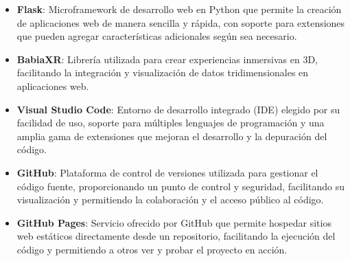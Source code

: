 \documentclass[a4paper, 12pt]{book}
\begin{document}
\begin{itemize}
    \item \textbf{Flask}: Microframework de desarrollo web en Python que permite la creación de aplicaciones web de manera sencilla y rápida, con soporte para extensiones que pueden agregar características adicionales según sea necesario.

    \item \textbf{BabiaXR}: Librería utilizada para crear experiencias inmersivas en 3D, facilitando la integración y visualización de datos tridimensionales en aplicaciones web.

    \item \textbf{Visual Studio Code}: Entorno de desarrollo integrado (IDE) elegido por su facilidad de uso, soporte para múltiples lenguajes de programación y una amplia gama de extensiones que mejoran el desarrollo y la depuración del código.

    \item \textbf{GitHub}: Plataforma de control de versiones utilizada para gestionar el código fuente, proporcionando un punto de control y seguridad, facilitando su visualización y permitiendo la colaboración y el acceso público al código.

    \item \textbf{GitHub Pages}: Servicio ofrecido por GitHub que permite hospedar sitios web estáticos directamente desde un repositorio, facilitando la ejecución del código y permitiendo a otros ver y probar el proyecto en acción.

\end{itemize}


\cleardoublepage


\end{document}
